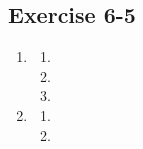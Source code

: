 \subsection{Exercise 6-5} %
    \begin{enumerate}[itemsep=6pt, label=\textbf{\arabic*}.]
	\item %
	\begin{enumerate}[noitemsep, label=\textbf{(\alph*)} ]
	    \item %
	    \item %
	    \item %
	\end{enumerate}

	\item %
	
	\begin{enumerate}[noitemsep, label=\textbf{(\alph*)} ]
	    \item %

	    \item %
	\end{enumerate}
    \end{enumerate}


